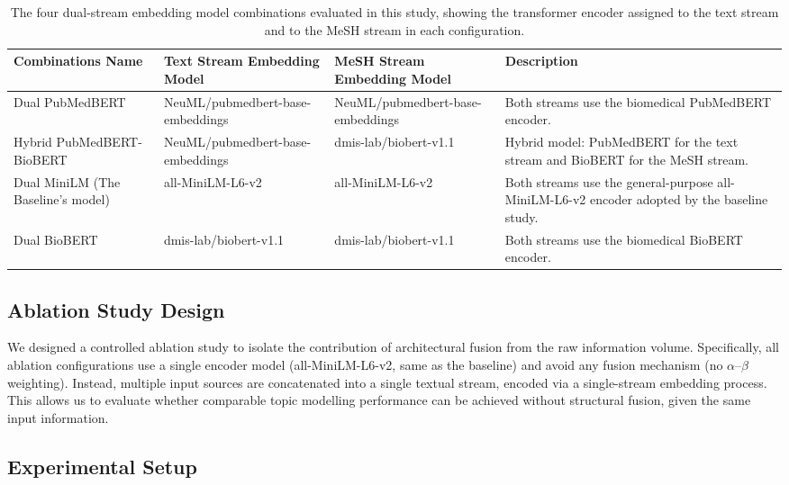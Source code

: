 \documentclass[authorproof,JACIII,researchpaper]{fujipressarticle}
\begin{document}
{\color{red}%
\begin{table}[!ht]
\caption{The four dual-stream embedding model combinations evaluated in this study, showing the transformer encoder assigned to the text stream and to the MeSH stream in each configuration.}
\label{tab:model_combinations}
\centering
\renewcommand{\arraystretch}{1.3}
\begin{tabular}{p{3.2cm}p{4.2cm}p{4cm}p{4.8cm}}
\hline
\textbf{Combinations Name} & \textbf{Text Stream Embedding Model} & \textbf{MeSH Stream Embedding Model} & \textbf{Description} \\
\hline
Dual PubMedBERT & NeuML/pubmedbert-base-embeddings & NeuML/pubmedbert-base-embeddings & Both streams use the biomedical PubMedBERT encoder. \\
\hline
Hybrid PubMedBERT-BioBERT & NeuML/pubmedbert-base-embeddings & dmis-lab/biobert-v1.1 & Hybrid model: PubMedBERT for the text stream and BioBERT for the MeSH stream. \\
\hline
Dual MiniLM (The Baseline's model) & all-MiniLM-L6-v2 & all-MiniLM-L6-v2 & Both streams use the general-purpose all-MiniLM-L6-v2 encoder adopted by the baseline study. \\
\hline
Dual BioBERT & dmis-lab/biobert-v1.1 & dmis-lab/biobert-v1.1 & Both streams use the biomedical BioBERT encoder. \\
\hline
\end{tabular}
\end{table}
}%

\subsection{Ablation Study Design}

We designed a controlled ablation study to isolate the contribution of architectural fusion from the raw information volume. Specifically, all ablation configurations use a single encoder model (all-MiniLM-L6-v2, same as the baseline) and avoid any fusion mechanism (no $\alpha$--$\beta$ weighting). Instead, multiple input sources are concatenated into a single textual stream, encoded via a single-stream embedding process. This allows us to evaluate whether comparable topic modelling performance can be achieved without structural fusion, given the same input information.

\subsection{Experimental Setup}
\end{document}
